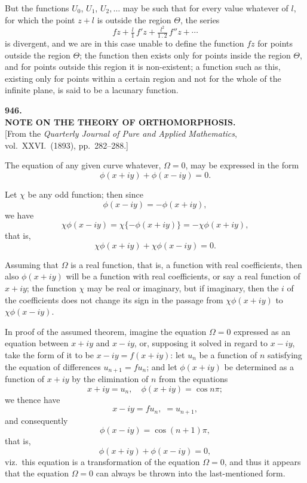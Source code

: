 \documentclass[11pt]{article}
\begin{document}
But the functions $U_{0}$, $U_{1}$, $U_{2},\ldots$ may be such that for every value whatever of $l$, for which the point $z + l$ is outside the region $\Theta$, the series
\[ fz + \tfrac{l}{1}\,f'z + \tfrac{l^{2}}{1\,.\,2}\,f''z + \cdots \]
is divergent, and we are in this case unable to define the function $fz$ for points outside the region $\Theta$; the function then exists only for points inside the region $\Theta$, and for points outside this region it is non-existent; a function such as this, existing only for points within a certain region and not for the whole of the infinite plane, is said to be a lacunary function.

\bigskip

\begin{center}
\textbf{\large 946.}\\[4pt]
\textbf{NOTE ON THE THEORY OF ORTHOMORPHOSIS.}\\[6pt]
[From the \textit{Quarterly Journal of Pure and Applied Mathematics}, vol.\ XXVI.\ (1893), pp.\ 282--288.]
\end{center}

\medskip
The equation of any given curve whatever, $\Omega = 0$, may be expressed in the form
\[ \phi(x + iy) + \phi(x - iy) = 0. \]

Let $\chi$ be any odd function; then since
\[ \phi(x - iy) = -\phi(x + iy), \]
we have
\[ \chi\phi(x - iy) = \chi\{-\phi(x + iy)\} = -\chi\phi(x + iy), \]
that is,
\[ \chi\phi(x + iy) + \chi\phi(x - iy) = 0. \]

Assuming that $\Omega$ is a real function, that is, a function with real coefficients, then also $\phi(x + iy)$ will be a function with real coefficients, or say a real function of $x + iy$; the function $\chi$ may be real or imaginary, but if imaginary, then the $i$ of the coefficients does not change its sign in the passage from $\chi\phi(x + iy)$ to $\chi\phi(x - iy)$.

In proof of the assumed theorem, imagine the equation $\Omega = 0$ expressed as an equation between $x + iy$ and $x - iy$, or, supposing it solved in regard to $x - iy$, take the form of it to be $x - iy = f(x + iy)$: let $u_{n}$ be a function of $n$ satisfying the equation of differences $u_{n+1} = fu_{n}$; and let $\phi(x + iy)$ be determined as a function of $x + iy$ by the elimination of $n$ from the equations
\[ x + iy = u_{n},\quad \phi(x + iy) = \cos n\pi; \]
we thence have
\[ x - iy = fu_{n},\;= u_{n+1}, \]
and consequently
\[ \phi(x - iy) = \cos(n + 1)\pi, \]
that is,
\[ \phi(x + iy) + \phi(x - iy) = 0, \]
viz.\ this equation is a transformation of the equation $\Omega = 0$, and thus it appears that the equation $\Omega = 0$ can always be thrown into the last-mentioned form.
\end{document}
